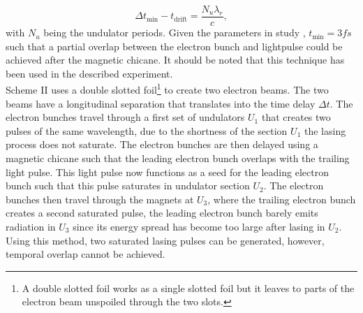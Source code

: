 \begin{equation}
\Delta t_{\text{min}}-t_{\text{drift}}=\frac{N_{u} \lambda_{r}}{c},
\label{eq:alberto-beam-missmatch}
\end{equation}
with $N_{u}$ being the undulator periods. Given the parameters in study \cite{Lutman-2013-PRL}, $t_{\text{min}}=3fs$ such that a partial overlap between the electron bunch and lightpulse could be achieved after the magnetic chicane. It should be noted that this technique has been used in the described experiment.\\
Scheme II uses a double slotted foil\footnote{A double slotted foil works as a single slotted foil but it leaves to parts of the electron beam unspoiled through the two slots.} to create two electron beams. The two beams have a longitudinal separation that translates into the time delay $\Delta t$. The electron bunches travel through a first set of undulators $U_{1}$ that creates two pulses of the same wavelength, due to the shortness of the section $U_{1}$ the lasing process does not saturate. The electron bunches are then delayed using a magnetic chicane such that the leading electron bunch overlaps with the trailing light pulse. This light pulse now functions as a seed for the leading electron bunch such that this pulse saturates in undulator section $U_{2}$. The electron bunches then travel through the magnets at $U_{3}$, where the trailing electron bunch creates a second saturated pulse, the leading electron bunch barely emits radiation in $U_{3}$ since its energy spread has become too large after lasing in $U_{2}$. Using this method, two saturated lasing pulses can be generated, however, temporal overlap cannot be achieved.
%
%
%
%
